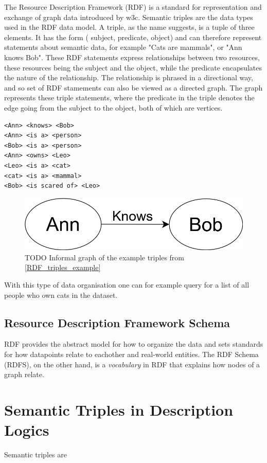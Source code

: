 The Resource Description Framework (RDF) is a standard for representation and exchange of graph data introduced by \gls{w3c}. Semantic triples are the data types used in the RDF data model. A triple, as the name suggests, is a tuple of three elements. It has the form ( subject, predicate, object) and can therefore represent statements about semantic data, for example "Cats are mammals", or "Ann knows Bob". These RDF statements express relationships between two resources, these resources being the subject and the object, while the predicate encapsulates the nature of the relationship. The relationship is phrased in a directional way, and so set of RDF stamements can also be viewed as a directed graph. The graph represents these triple statements, where the predicate in the triple denotes the edge going from the subject to the object, both of which are vertices.

\begin{lstlisting}[caption={Example of RDF triple set written in informal pseudocode},label={RDF_triples_example}]
<Ann> <knows> <Bob>
<Ann> <is a> <person>
<Bob> <is a> <person>
<Ann> <owns> <Leo>
<Leo> <is a> <cat>
<cat> <is a> <mammal>
<Bob> <is scared of> <Leo>
\end{lstlisting}

\begin{figure}
\centering
    \includegraphics[scale=0.3]{figures/RDF_triple}
    \caption{TODO Informal graph of the example triples from \ref{RDF_triples_example}}
    
    \label{fig:RDF_figure}
\end{figure}

With this type of data organisation one can for example query for a list of all people who own cats in the dataset.

\subsection{Resource Description Framework Schema}
RDF provides the abstract model for how to organize the data and sets standards for how datapoints relate to eachother and real-world entities. The RDF Schema (RDFS), on the other hand, is a \emph{vocabulary} in RDF that explains how nodes of a graph relate.

\section{Semantic Triples in Description Logics}
Semantic triples are 
\fi
